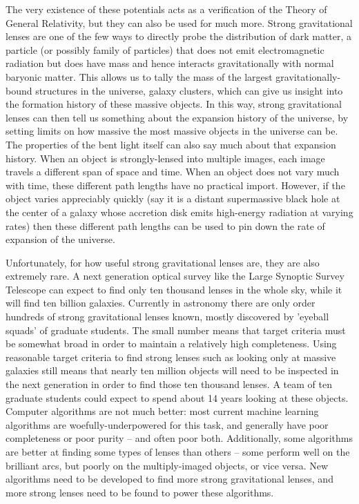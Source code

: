 \documentclass[10pt,twocolumn,letterpaper]{article}
\begin{document}
The very existence of these potentials acts as a verification of the Theory of
General Relativity, but they can also be used for much more. Strong
gravitational lenses are one of the few ways to directly probe the distribution
of dark matter, a particle (or possibly family of particles) that does not emit
electromagnetic radiation but does have mass and hence interacts
gravitationally with normal baryonic matter. This allows us to tally the mass
of the largest gravitationally-bound structures in the universe, galaxy
clusters, which can give us insight into the formation history of these massive
objects. In this way, strong gravitational lenses can then tell us something
about the expansion history of the universe, by setting limits on how massive
the most massive objects in the universe can be. The properties of the bent
light itself can also say much about that expansion history. When an object is
strongly-lensed into multiple images, each image travels a different span of
space and time. When an object does not vary much with time, these different
path lengths have no practical import. However, if the object varies
appreciably quickly (say it is a distant supermassive black hole at the center
of a galaxy whose accretion disk emits high-energy radiation at varying rates)
then these different path lengths can be used to pin down the rate of expansion
of the universe.

Unfortunately, for how useful strong gravitational lenses are, they are also
extremely rare. A next generation optical survey like the Large Synoptic Survey
Telescope can expect to find only ten thousand lenses in the whole sky, while
it will find ten billion galaxies. Currently in astronomy there are only order
hundreds of strong gravitational lenses known, mostly discovered by 'eyeball
squads' of graduate students. The small number means that target criteria must
be somewhat broad in order to maintain a relatively high completeness. Using
reasonable target criteria to find strong lenses such as looking only at
massive galaxies still means that nearly ten million objects will need to be
inspected in the next generation in order to find those ten thousand lenses. A
team of ten graduate students could expect to spend about 14 years looking at
these objects. Computer algorithms are not much better: most current machine
learning algorithms are woefully-underpowered for this task, and generally have
poor completeness or poor purity -- and often poor both. Additionally, some
algorithms are better at finding some types of lenses than others -- some
perform well on the brilliant arcs, but poorly on the multiply-imaged objects,
or vice versa. New algorithms need to be developed to find more strong
gravitational lenses, and more strong lenses need to be found to power these
algorithms.
\end{document}
